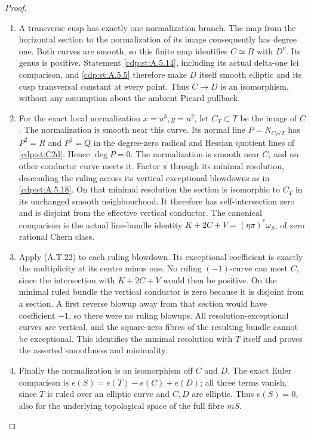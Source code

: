 \begin{proof}

\begin{enumerate}[label={$\langle1\rangle$\arabic*.},leftmargin=*]
\item A transverse cusp has exactly one normalization
branch. The map from the horizontal section to the
normalization of its image consequently has degree
one. Both curves are smooth, so this finite map
identifies $C\simeq B$ with $D^\nu$. Its genus is
positive. Statement \ref{cdp:st:A.5.14}, including its actual
delta-one lci comparison, and \ref{cdp:st:A.5.5} therefore make
$D$ itself smooth elliptic and its cusp transversal
constant at every point. Thus $C\to D$ is an
isomorphism, without any assumption about the
ambient Picard pullback.

\item For the exact local normalization $x=u^3,y=u^2$,
let $C_T\subset T$ be the image of $C$. The
normalization is smooth near this curve. Its normal
line $P=N_{C_T/T}$ has $P^2=R$ and $P^3=Q$
in the degree-zero radical and Hessian quotient
lines of \ref{cdp:st:C2d}. Hence $\deg P=0$. The normalization
is smooth near $C$, and no other conductor curve
meets it. Factor $\pi$ through its minimal
resolution, descending the ruling across its
vertical exceptional blowdowns as in \ref{cdp:st:A.5.18}.
On that minimal resolution the section is isomorphic
to $C_T$ in its unchanged smooth neighbourhood. It
therefore has self-intersection zero and is disjoint from
the effective vertical conductor. The canonical
comparison is the actual line-bundle identity
$K+2C+V=(\eta\pi)^*\omega_S$, of zero rational
Chern class.

\item Apply (A.T.22) to each ruling blowdown. Its
exceptional coefficient is exactly the multiplicity
at its centre minus one. No ruling $(-1)$-curve
can meet $C$, since the intersection with $K+2C+V$
would then be positive. On the minimal ruled
bundle the vertical conductor is zero because it
is disjoint from a section. A first reverse blowup
away from that section would have coefficient
$-1$, so there were no ruling blowups. All
resolution-exceptional curves are vertical, and
the square-zero fibres of the resulting bundle
cannot be exceptional. This identifies the minimal
resolution with $T$ itself and proves the asserted
smoothness and minimality.

\item Finally the normalization is an isomorphism off
$C$ and $D$. The exact Euler comparison is
$e(S)=e(T)-e(C)+e(D)$; all three terms vanish,
since $T$ is ruled over an elliptic curve and
$C,D$ are elliptic. Thus $e(S)=0$, also for the
underlying topological space of the full fibre $mS$.

\end{enumerate}
\end{proof}
